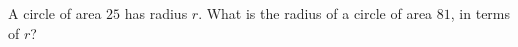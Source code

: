 A circle of area $25$ has radius $r$. What is the radius of a circle of area $81$, in terms of $r$?

